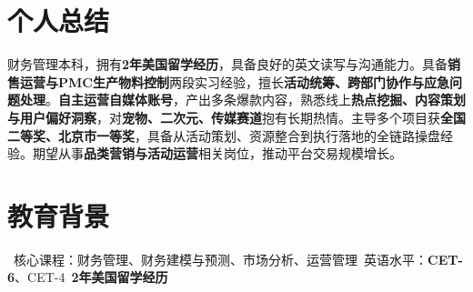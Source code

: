 \documentclass{resume}
\begin{document}



\section{个人总结}
财务管理本科，拥有\textbf{2年美国留学经历}，具备良好的英文读写与沟通能力。具备\textbf{销售运营与PMC生产物料控制}两段实习经验，擅长\textbf{活动统筹、跨部门协作与应急问题处理}。\textbf{自主运营自媒体账号}，产出多条爆款内容，熟悉线上\textbf{热点挖掘、内容策划与用户偏好洞察}，对\textbf{宠物、二次元、传媒赛道}抱有长期热情。主导多个项目获\textbf{全国二等奖、北京市一等奖}，具备从活动策划、资源整合到执行落地的全链路操盘经验。期望从事\textbf{品类营销与活动运营}相关岗位，推动平台交易规模增长。

\section{教育背景}
\ 核心课程：财务管理、财务建模与预测、市场分析、运营管理\textperiodcentered\ 英语水平：\textbf{CET-6}、CET-4\textperiodcentered\ \textbf{2年美国留学经历}
\end{document}
